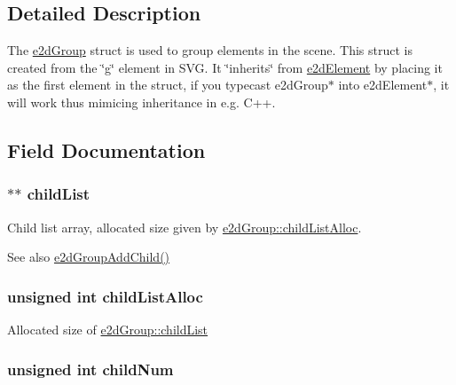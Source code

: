\subsection{Detailed Description}
The \hyperlink{structe2dGroup}{e2d\-Group} struct is used to group elements in the scene. This struct is created from the \char`\"{}g\char`\"{} element in S\-V\-G. It \char`\"{}inherits\char`\"{} from \hyperlink{structe2dElement}{e2d\-Element} by placing it as the first element in the struct, if you typecast e2d\-Group$\ast$ into e2d\-Element$\ast$, it will work thus mimicing inheritance in e.\-g. C++. 

\subsection{Field Documentation}
\hypertarget{structe2dGroup_a55f6dde874716dc99dcd270fc0999a01}{
\subsubsection[{child\-List}]{$\ast$$\ast$ {\bf child\-List}}}\label{structe2dGroup_a55f6dde874716dc99dcd270fc0999a01}
Child list array, allocated size given by \hyperlink{structe2dGroup_a9c89d7cf35b835ef1917855c78a79cc5}{e2d\-Group\-::child\-List\-Alloc}. \begin{DoxySeeAlso}{See also}
\hyperlink{group__e2dGroup_ga6ae76730f78ad731621e9286a3980b8a}{e2d\-Group\-Add\-Child()} 
\end{DoxySeeAlso}
\hypertarget{structe2dGroup_a9c89d7cf35b835ef1917855c78a79cc5}{
\subsubsection[{child\-List\-Alloc}]{\setlength{\rightskip}{0pt plus 5cm}unsigned int {\bf child\-List\-Alloc}}}\label{structe2dGroup_a9c89d7cf35b835ef1917855c78a79cc5}
Allocated size of \hyperlink{structe2dGroup_a55f6dde874716dc99dcd270fc0999a01}{e2d\-Group\-::child\-List} \hypertarget{structe2dGroup_a0af3697c2c9df6ed0ddd340cded35d65}{
\subsubsection[{child\-Num}]{\setlength{\rightskip}{0pt plus 5cm}unsigned int {\bf child\-Num}}}\label{structe2dGroup_a0af3697c2c9df6ed0ddd340cded35d65}
